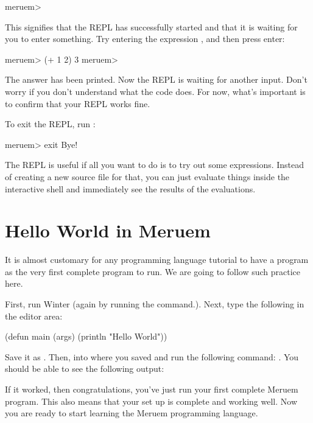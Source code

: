 \begin{REPL}
meruem>
\end{REPL}

This signifies that the REPL has successfully started and that it is waiting for you to enter something. Try entering the expression , and then press enter:

\begin{REPL}
meruem> (+ 1 2)
3
meruem>
\end{REPL}

The answer  has been printed. Now the REPL is waiting for another input. Don't worry if you don't understand what the code  does. For now, what's important is to confirm that your REPL works fine.

To exit the REPL, run :

\begin{REPL}
meruem> exit
Bye!
\end{REPL}

The REPL is useful if all you want to do is to try out some expressions. Instead of creating a new source file for that, you can just evaluate things inside the interactive shell and immediately see the results of the evaluations.

\section{Hello World in Meruem}
It is almost customary for any programming language tutorial to have a  program as the very first complete program to run. We are going to follow such practice here.

First, run Winter (again by running the  command.). Next, type the following in the editor area:

\begin{Meruem}
(defun main (args) (println "Hello World"))
\end{Meruem}

Save it as . Then,  into where you saved  and run the following command: . You should be able to see the following output:


If it worked, then congratulations, you've just run your first complete Meruem program. This also means that your set up is complete and working well. Now you are ready to start learning the Meruem programming language.